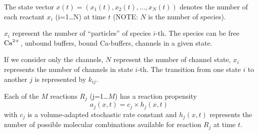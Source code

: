 The state vector $x(t) = (x_1(t), x_2(t), \ldots, x_N(t))$ denotes the number of
each reactant $x_i$ (i=1\ldots N) at time $t$ (NOTE: $N$ is the number of
species).

\begin{framed}
$x_i$ represent the number of ``particles'' of species $i$-th. The species can
be free ${\text{Ca}^{2+}}$, unbound buffers, bound Ca-buffers, channels in a given state. 

If we consider only the channels, $N$ represent the number of channel state,
$x_i$ represents the number of channels  in state $i$-th. The transition from
one state $i$ to another $j$ is  represented by $k_{ij}$. 
\end{framed}

Each of the $M$ reactions $R_j$ (j=1\ldots $M$)	has a reaction propensity
\begin{equation}
a_j(x,t) = c_j \times h_j(x,t)
\end{equation}
with $c_j$ is a volume-adapted stochastic rate constant and $h_j(x,t)$
represents the number of possible molecular combinations available for reaction
$R_j$ at time $t$. 

